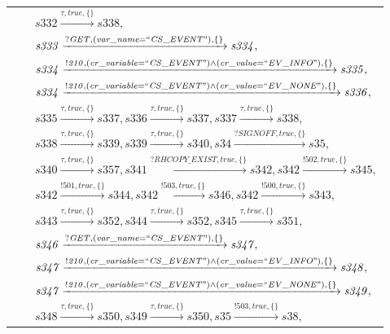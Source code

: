 \begin{tabular}{lcl}
& & $\mathit{s332}\xrightarrow{\mathit{\tau}, \mathit{true}, \{\}}\mathit{s338},$ \\
& & $\mathit{s333}\xrightarrow{\mathit{?GET}, \mathit{(var\_name = ``CS\_EVENT")}, \{\}}\mathit{s334},$ \\
& & $\mathit{s334}\xrightarrow{\mathit{!210}, \mathit{(cr\_variable = ``CS\_EVENT") \land (cr\_value = ``EV\_INFO")}, \{\}}\mathit{s335},$ \\
& & $\mathit{s334}\xrightarrow{\mathit{!210}, \mathit{(cr\_variable = ``CS\_EVENT") \land (cr\_value = ``EV\_NONE")}, \{\}}\mathit{s336},$ \\
& & $\mathit{s335}\xrightarrow{\mathit{\tau}, \mathit{true}, \{\}}\mathit{s337},\mathit{s336}\xrightarrow{\mathit{\tau}, \mathit{true}, \{\}}\mathit{s337},\mathit{s337}\xrightarrow{\mathit{\tau}, \mathit{true}, \{\}}\mathit{s338},$ \\
& & $\mathit{s338}\xrightarrow{\mathit{\tau}, \mathit{true}, \{\}}\mathit{s339},\mathit{s339}\xrightarrow{\mathit{\tau}, \mathit{true}, \{\}}\mathit{s340},\mathit{s34}\xrightarrow{\mathit{?SIGNOFF}, \mathit{true}, \{\}}\mathit{s35},$ \\
& & $\mathit{s340}\xrightarrow{\mathit{\tau}, \mathit{true}, \{\}}\mathit{s357},\mathit{s341}\xrightarrow{\mathit{?RHCOPY\_EXIST}, \mathit{true}, \{\}}\mathit{s342},\mathit{s342}\xrightarrow{\mathit{!502}, \mathit{true}, \{\}}\mathit{s345},$ \\
& & $\mathit{s342}\xrightarrow{\mathit{!501}, \mathit{true}, \{\}}\mathit{s344},\mathit{s342}\xrightarrow{\mathit{!503}, \mathit{true}, \{\}}\mathit{s346},\mathit{s342}\xrightarrow{\mathit{!500}, \mathit{true}, \{\}}\mathit{s343},$ \\
& & $\mathit{s343}\xrightarrow{\mathit{\tau}, \mathit{true}, \{\}}\mathit{s352},\mathit{s344}\xrightarrow{\mathit{\tau}, \mathit{true}, \{\}}\mathit{s352},\mathit{s345}\xrightarrow{\mathit{\tau}, \mathit{true}, \{\}}\mathit{s351},$ \\
& & $\mathit{s346}\xrightarrow{\mathit{?GET}, \mathit{(var\_name = ``CS\_EVENT")}, \{\}}\mathit{s347},$ \\
& & $\mathit{s347}\xrightarrow{\mathit{!210}, \mathit{(cr\_variable = ``CS\_EVENT") \land (cr\_value = ``EV\_INFO")}, \{\}}\mathit{s348},$ \\
& & $\mathit{s347}\xrightarrow{\mathit{!210}, \mathit{(cr\_variable = ``CS\_EVENT") \land (cr\_value = ``EV\_NONE")}, \{\}}\mathit{s349},$ \\
& & $\mathit{s348}\xrightarrow{\mathit{\tau}, \mathit{true}, \{\}}\mathit{s350},\mathit{s349}\xrightarrow{\mathit{\tau}, \mathit{true}, \{\}}\mathit{s350},\mathit{s35}\xrightarrow{\mathit{!503}, \mathit{true}, \{\}}\mathit{s38},$ \\

\end{tabular}

